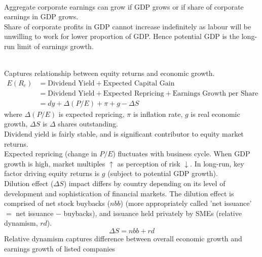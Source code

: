 \begin{remark} \\
Aggregate corporate earnings can grow if GDP grows or if share of corporate earnings in GDP grows.\\
Share of corporate profits in GDP cannot increase indefinitely as labour will be unwilling to work for lower proportion of GDP. Hence potential GDP is the long-run limit of earnings growth.
\end{remark}

\begin{definition} \\
Captures relationship between equity returns and economic growth.
\begin{align}
E(R_e) &= \text{Dividend Yield} + \text{Expected Capital Gain} \nonumber \\
&= \text{Dividend Yield} + \text{Expected Repricing} + \text{Earnings Growth per Share} \nonumber\\
&= dy + \Delta(P/E) + \pi + g - \Delta S \nonumber
\end{align}
where $\Delta (P/E)$ is expected repricing, $\pi$ is inflation rate, $g$ is real economic growth, $\Delta S$ is $\Delta$ shares outstanding.\\
Dividend yield is fairly stable, and is significant contributor to equity market returns.\\
Expected repricing (change in $P/E$) fluctuates with business cycle. When GDP growth is high, market multiples $\uparrow$ as perception of risk $\downarrow$. In long-run, key factor driving equity returns is $g$ (subject to potential GDP growth).\\
Dilution effect ($\Delta S$) impact differs by country depending on its level of development and sophistication of financial markets. The dilution effect is comprised of net stock buybacks ($nbb$) (more appropriately called 'net issuance' $=$ net issuance $-$ buybacks), and issuance held privately by SMEs (relative dynamism, $rd$).
\begin{equation}
\Delta S = nbb + rd \nonumber
\end{equation}
Relative dynamism captures difference between overall economic growth and earnings growth of listed companies
\end{definition}

